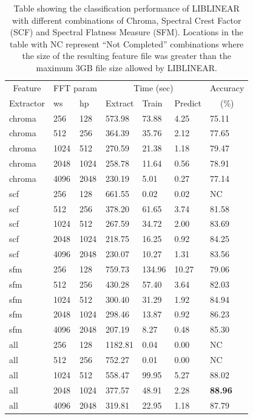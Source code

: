 \begin{table}
\begin{tabular}{|l|l|l|l|l|l|l|}
\hline
\multicolumn{1}{|c|}{Feature} &\multicolumn{2}{c|}{FFT param} & \multicolumn{3}{c|}{Time (sec)} & Accuracy \\
\hhline{|~|-|-|-|-|-|~|}
Extractor & ws & hp & Extract & Train & Predict & \multicolumn{1}{c|}{(\%)} \\
\hhline{|=|=|=|=|=|=|=|}
chroma & 256 & 128    &   573.98  &   73.88  &   4.25  &  75.11  \\
chroma & 512 & 256    &   364.39  &   35.76  &   2.12  &  77.65  \\
chroma & 1024 & 512   &   270.59  &   21.38  &   1.18  &  79.47  \\
chroma & 2048 & 1024  &   258.78  &   11.64  &   0.56  &  78.91  \\
chroma & 4096 & 2048  &   230.19  &    5.01  &   0.27  &  77.14  \\
scf & 256 & 128       &   661.55  &    0.02  &   0.02  &  NC  \\
scf & 512 & 256       &   378.20  &   61.65  &   3.74  &  81.58  \\
scf & 1024 & 512      &   267.59  &   34.72  &   2.00  &  83.69  \\
scf & 2048 & 1024     &   218.75  &   16.25  &   0.92  &  84.25  \\
scf & 4096 & 2048     &   230.07  &   10.27  &   1.31  &  83.56  \\
\hline
sfm & 256 & 128       &   759.73  &  134.96  &  10.27  &  79.06  \\
sfm & 512 & 256       &   430.28  &   57.40  &   3.64  &  82.03  \\
sfm & 1024 & 512      &   300.40  &   31.29  &   1.92  &  84.94  \\
sfm & 2048 & 1024     &   298.46  &   13.87  &   0.92  &  86.23  \\
sfm & 4096 & 2048     &   207.19  &    8.27  &   0.48  &  85.30  \\
all & 256 & 128       &  1182.81  &    0.04  &   0.00  &  NC  \\
all & 512 & 256       &   752.27  &    0.01  &   0.00  &  NC  \\
all & 1024 & 512      &   558.47  &   99.95  &   5.27  &  88.02  \\
all & 2048 & 1024     &   377.57  &   48.91  &   2.28  &  \textbf{88.96}  \\
all & 4096 & 2048     &   319.81  &   22.95  &   1.18  &  87.79  \\
\hline
\end{tabular}
\caption{Table showing the classification performance of LIBLINEAR
  with different combinations of Chroma, Spectral Crest Factor (SCF)
  and Spectral Flatness Measure (SFM).  Locations in the table with NC
  represent ``Not Completed'' combinations where the size of the
  resulting feature file was greater than the maximum 3GB file size
  allowed by LIBLINEAR.}
\label{table:obv-different-chroma}
\end{table}

